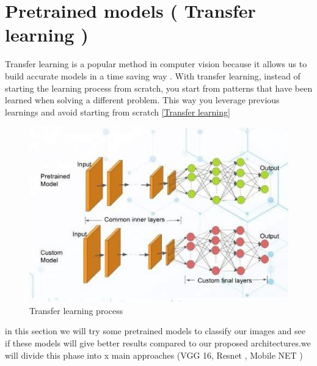 \section{Pretrained models ( Transfer learning )}
Transfer learning is a popular method in computer vision because it allows us to build accurate models in a time saving way \cite{art39}. With transfer learning, instead of starting the learning process from scratch, you start from patterns that have been learned when solving a different problem. This way you leverage previous learnings and avoid starting from scratch \ref{Transfer learning} \\
\begin{figure}[H]
    \centering
    \includegraphics[width=1\textwidth]{chapters/chapter04/fig04/transfer.jpeg}
    \caption{Transfer learning process}
    \label{fig:my_label}
\end{figure}
in this section we will try some pretrained models to classify our images and see if
these models will give better results compared to our proposed architectures.we will divide this phase into x main approaches (VGG 16, Resnet , Mobile NET )

